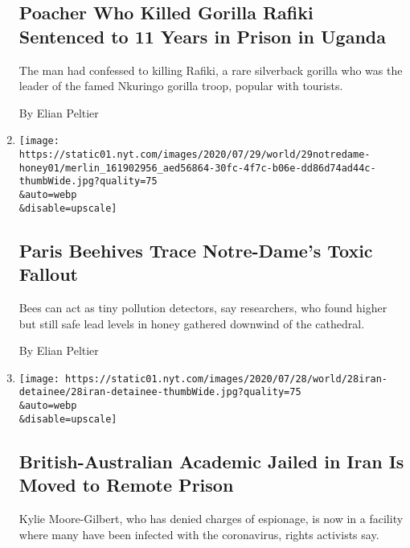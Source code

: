 \begin{enumerate}
  \hypertarget{poacher-who-killed-gorilla-rafiki-sentenced-to-11-years-in-prison-in-uganda}{%
  \subsection{Poacher Who Killed Gorilla Rafiki Sentenced to 11 Years in
  Prison in
  Uganda}\label{poacher-who-killed-gorilla-rafiki-sentenced-to-11-years-in-prison-in-uganda}}

  The man had confessed to killing Rafiki, a rare silverback gorilla who
  was the leader of the famed Nkuringo gorilla troop, popular with
  tourists.

  By Elian Peltier
\item
  \href{/2020/07/29/world/europe/honey-lead-notredame-fire-paris.html}{}

  \texttt{[image: https://static01.nyt.com/images/2020/07/29/world/29notredame-honey01/merlin\_161902956\_aed56864-30fc-4f7c-b06e-dd86d74ad44c-thumbWide.jpg?quality=75\\\&auto=webp\\\&disable=upscale]}

  \hypertarget{paris-beehives-trace-notre-dames-toxic-fallout}{%
  \subsection{Paris Beehives Trace Notre-Dame's Toxic
  Fallout}\label{paris-beehives-trace-notre-dames-toxic-fallout}}

  Bees can act as tiny pollution detectors, say researchers, who found
  higher but still safe lead levels in honey gathered downwind of the
  cathedral.

  By Elian Peltier
\item
  \href{/2020/07/28/world/europe/british-australian-academic-jail-iran-qarchak.html}{}

  \texttt{[image: https://static01.nyt.com/images/2020/07/28/world/28iran-detainee/28iran-detainee-thumbWide.jpg?quality=75\\\&auto=webp\\\&disable=upscale]}

  \hypertarget{british-australian-academic-jailed-in-iran-is-moved-to-remote-prison}{%
  \subsection{British-Australian Academic Jailed in Iran Is Moved to
  Remote
  Prison}\label{british-australian-academic-jailed-in-iran-is-moved-to-remote-prison}}

  Kylie Moore-Gilbert, who has denied charges of espionage, is now in a
  facility where many have been infected with the coronavirus, rights
  activists say.


\end{enumerate}
